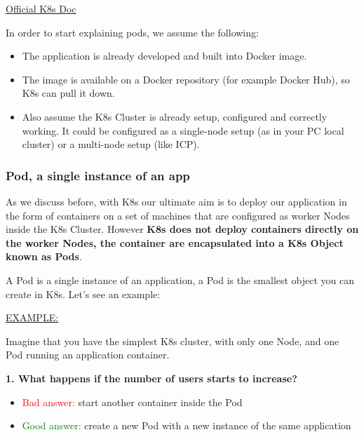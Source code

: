 \documentclass{article}
\newenvironment{blocktemplate}[1]{%
    \tcolorbox[beamer,%
    noparskip,breakable,
    colframe=Blue,%
    colbacklower=LimeGreen!75!LightGreen,%
    title=#1]}%
    {\endtcolorbox}
\begin{document}
\href{https://kubernetes.io/docs/concepts/workloads/pods/}{Official K8s Doc}

\begin{blocktemplate}{Note}
In order to start explaining pods, we assume the following:

\begin{itemize}
    \item The application is already developed and built into Docker image.
    \item The image is available on a Docker repository (for example Docker Hub), so K8s can pull it down.
    \item Also assume the K8s Cluster is already setup, configured and correctly working. It could be configured as a single-node setup (as in your PC local cluster) or a multi-node setup (like ICP).
\end{itemize}
\end{blocktemplate}

\subsubsection{Pod, a single instance of an app}

As we discuss before, with K8s our ultimate aim is to deploy our application in the form of containers on a set of machines that are configured as worker Nodes inside the K8s Cluster. However \textbf{K8s does not deploy containers directly on the worker Nodes, the container are encapsulated into a K8s Object known as Pods}.

A Pod is a single instance of an application, a Pod is the smallest object you can create in K8s. Let's see an example:

\underline{EXAMPLE:}

Imagine that you have the simplest K8s cluster, with only one Node, and one Pod running an application container.

\textbf{1. What happens if the number of users starts to increase?}

\begin{itemize}
    \item \textcolor{red}{Bad answer:} start another container inside the Pod
    \item \textcolor{green}{Good answer:} create a new Pod with a new instance of the same application
\end{itemize}
\end{document}
